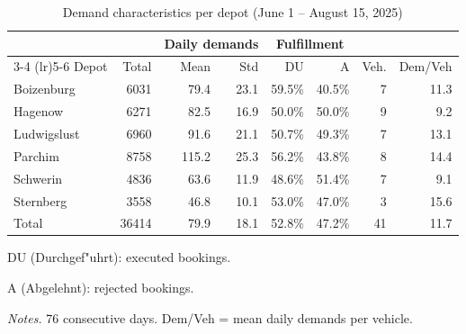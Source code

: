 \begin{table}[ht]
\centering
\caption{Demand characteristics per depot (June 1 -- August 15, 2025)}
\label{tab:demand_characteristics}
\begin{threeparttable}
\begin{tabular}{l rrr rr rr}
\toprule
& & \multicolumn{2}{c}{Daily demands} & \multicolumn{2}{c}{Fulfillment} & \\
\cmidrule(lr){3-4} \cmidrule(lr){5-6}
Depot & Total & Mean & Std & DU\tnote{a} & A\tnote{b} & Veh. & Dem/Veh \\
\midrule
Boizenburg & 6031 & 79.4 & 23.1 & 59.5\% & 40.5\% & 7 & 11.3 \\
Hagenow & 6271 & 82.5 & 16.9 & 50.0\% & 50.0\% & 9 & 9.2 \\
Ludwigslust & 6960 & 91.6 & 21.1 & 50.7\% & 49.3\% & 7 & 13.1 \\
Parchim & 8758 & 115.2 & 25.3 & 56.2\% & 43.8\% & 8 & 14.4 \\
Schwerin & 4836 & 63.6 & 11.9 & 48.6\% & 51.4\% & 7 & 9.1 \\
Sternberg & 3558 & 46.8 & 10.1 & 53.0\% & 47.0\% & 3 & 15.6 \\
\midrule
Total & 36414 & 79.9 & 18.1 & 52.8\% & 47.2\% & 41 & 11.7 \\
\bottomrule
\end{tabular}
\begin{tablenotes}
\smaller
\item[a] DU (Durchgef"uhrt): executed bookings.
\item[b] A (Abgelehnt): rejected bookings.
\item \textit{Notes.} 76 consecutive days. Dem/Veh = mean daily demands per vehicle.
\end{tablenotes}
\end{threeparttable}
\end{table}
